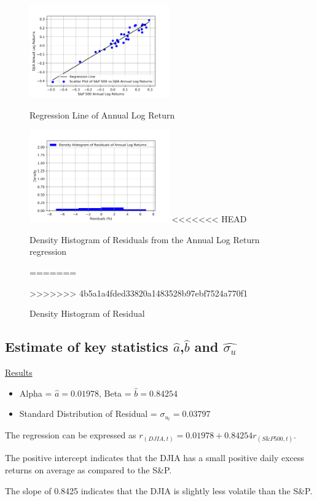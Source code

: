 \documentclass[a4paper]{article}
\begin{document}
	\begin{figure}[htbp]
		\centering
		\begin{minipage}[t]{0.48\textwidth}
			\centering
			\includegraphics[width=6cm]{Ann_Scatter.png}
			\caption{Regression Line of Annual Log Return}
		\end{minipage}
		\begin{minipage}[t]{0.48\textwidth}
			\centering
			\includegraphics[width=6cm]{Ann_Hist.png}
<<<<<<< HEAD
			\caption{Density Histogram of Residuals from the Annual Log Return regression}
=======
			\caption{Density Histogram of Residual}
>>>>>>> 4b5a1a4fded33820a1483528b97ebf7524a770f1
		\end{minipage}
	\end{figure}
	
	\subsection{Estimate of key statistics $\hat{a}$,$\hat{b}$ and $\hat{\sigma_u}$}
	\underline{Results}
	\begin{itemize}[nosep]
		\item Alpha = $\hat{a} = 0.01978$, Beta = $\hat{b} = 0.84254$
		\item Standard Distribution of Residual = $\sigma_{u_t} = 0.03797$
	\end{itemize}

    The regression can be expressed as $r_{(DJIA, t)} = 0.01978 +  0.84254 r_{(S\&P500, t)}$.
	
	The positive intercept indicates that the DJIA has a small positive daily excess returns on average as compared to the S\&P. 
	
	The slope of 0.8425 indicates that the DJIA is slightly less volatile than the S\&P. 
	
\end{document}
